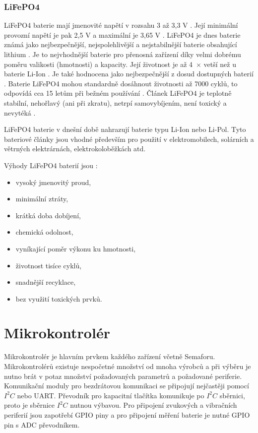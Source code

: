 \subsubsection{LiFePO4}
LiFePO4 baterie mají jmenovité napětí v rozsahu 3 až 3,3 V \cite{LiFePO4_malina}. Její minimální provozní napětí je pak 2,5 V a maximální je 3,65 V \cite{LiFePO4_malina}.
LiFePO4 je dnes baterie známá jako nejbezpečnější, nejspolehlivější a nejstabilnější baterie obsahující lithium \cite{LiFePO4_malina}. Je to nejvhodnější baterie pro 
přenosná zařízení díky velmi dobrému poměru valikosti (hmotnosti) a kapacity. Její životnost je až 4~$\times$ vetší než u baterie Li-Ion \cite{LiFePO4_malina}. Je také hodnocena
jako nejbezpečnější z dosud dostupných baterií \cite{LiFePO4_malina}. Baterie LiFePO4 mohou standardně dosáhnout životnosti až 7000 cyklů, to odpovídá cca 15 letům při bežném
používání \cite{LiFePO4_malina}. Článek LiFePO4 je teplotně stabilní, nehořlavý (ani při zkratu), netrpí samovybíjením, není toxický a nevytéká \cite{LiFePO4_malina}.

LiFePO4 baterie v dnešní době nahrazují baterie typu Li-Ion nebo Li-Pol.
Tyto bateriové články jsou vhodné především pro použití v elektromobilech, solárních a větrných elektrárnách, elektrokoloběžkách atd. 

Výhody LiFePO4 baterií jsou \cite{LiFePO4_smart}:
\begin{itemize}
  \item vysoký jmenovitý proud,
  \item minimální ztráty,
  \item krátká doba dobíjení,
  \item chemická odolnost,
  \item vyníkající poměr výkonu ku hmotnosti,
  \item životnost tisíce cyklů,
  \item snadnější recyklace,
  \item bez využití toxických prvků.
\end{itemize}


\section{Mikrokontrolér}
Mikrokontrolér je hlavním prvkem každého zařízení včetně Semaforu. Mikrokontrolérů existuje nespočetné množství od mnoha výrobců a při výběru je nutno brát v potaz
množství požadovaných parametrů a požadované periferie. 
Komunikační moduly pro bezdrátovou komunikaci se připojují nejčastěji pomocí $I^2C$ nebo UART. Převodník pro kapacitní tlačítka komunikuje po $I^2C$ sběrnici, proto je sběrnice
$I^2C$ nutnou výbavou. Pro připojení zvukových a vibračních periferií jsou zapotřebí GPIO piny a pro připojení měření baterie je nutné GPIO pin s ADC převodníkem. 

